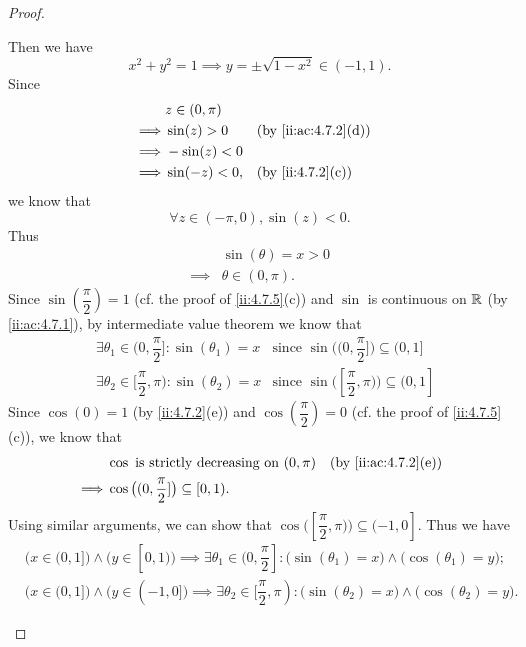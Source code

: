 \begin{proof}
\begin{itemize}
          Then we have
          \[
            x^2 + y^2 = 1 \implies y = \pm \sqrt{1 - x^2} \in (-1, 1).
          \]
          Since
          \begin{align*}
                     & z \in (0, \pi)                          \\
            \implies & \sin(z) > 0    &  & \by{ii:ac:4.7.2}[d] \\
            \implies & -\sin(z) < 0                            \\
            \implies & \sin(-z) < 0,  &  & \by{ii:4.7.2}[c]
          \end{align*}
          we know that
          \[
            \forall z \in (-\pi, 0), \sin(z) < 0.
          \]
          Thus
          \begin{align*}
                     & \sin(\theta) = x > 0 \\
            \implies & \theta \in (0, \pi).
          \end{align*}
          Since \(\sin(\dfrac{\pi}{2}) = 1\) (cf. the proof of \cref{ii:4.7.5}(c)) and \(\sin\) is continuous on \(\mathbb{R}\) (by \cref{ii:ac:4.7.1}), by intermediate value theorem we know that
          \begin{align*}
             & \exists \theta_1 \in (0, \dfrac{\pi}{2}] : \sin(\theta_1) = x   & \text{since } \sin\big((0, \dfrac{\pi}{2}]\big) \subseteq (0, 1]   \\
             & \exists \theta_2 \in [\dfrac{\pi}{2}, \pi) : \sin(\theta_2) = x & \text{since } \sin\big([\dfrac{\pi}{2}, \pi)\big) \subseteq (0, 1]
          \end{align*}
          Since \(\cos(0) = 1\) (by \cref{ii:4.7.2}(e)) and \(\cos(\dfrac{\pi}{2}) = 0\) (cf. the proof of \cref{ii:4.7.5}(c)), we know that
          \begin{align*}
                     & \cos \text{ is strictly decreasing on } (0, \pi)    &  & \by{ii:ac:4.7.2}[e] \\
            \implies & \cos\big((0, \dfrac{\pi}{2}]\big) \subseteq [0, 1).
          \end{align*}
          Using similar arguments, we can show that \(\cos\big([\dfrac{\pi}{2}, \pi)\big) \subseteq (-1, 0]\).
          Thus we have
          \begin{align*}
             & \big(x \in (0, 1]\big) \land \big(y \in [0, 1)\big) \implies \exists \theta_1 \in (0, \dfrac{\pi}{2}] : \big(\sin(\theta_1) = x\big) \land \big(\cos(\theta_1) = y\big);    \\
             & \big(x \in (0, 1]\big) \land \big(y \in (-1, 0]\big) \implies \exists \theta_2 \in [\dfrac{\pi}{2}, \pi) : \big(\sin(\theta_2) = x\big) \land \big(\cos(\theta_2) = y\big).

\end{align*}
\end{itemize}
\end{proof}
